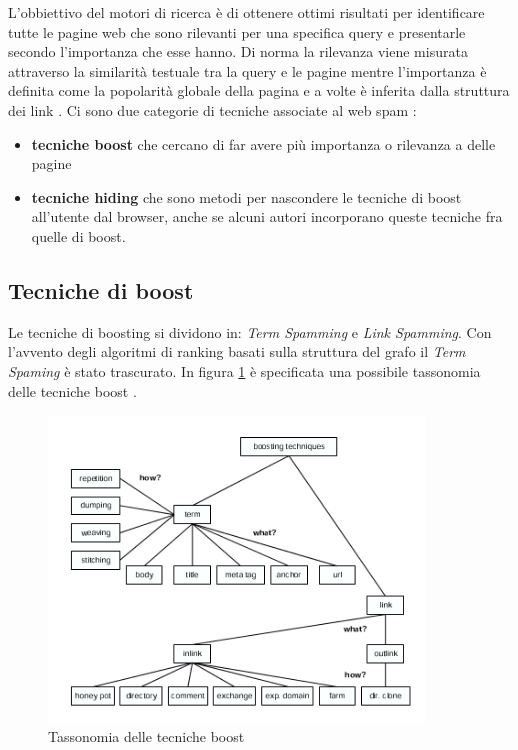 L'obbiettivo del motori di ricerca è di ottenere ottimi risultati per identificare tutte le pagine web che sono rilevanti per una specifica query e presentarle secondo l'importanza che esse hanno. Di norma la rilevanza viene misurata attraverso la similarità testuale tra la query e le pagine mentre l'importanza è definita come la popolarità globale della pagina e a volte è inferita dalla struttura dei link \cite{ilprints646}. Ci sono due categorie di tecniche associate al web spam \cite{ilprints646}:
\begin{itemize}
\item \textbf{tecniche boost} che cercano di far avere più importanza o rilevanza a delle pagine
\item \textbf{tecniche hiding} che sono metodi per nascondere le tecniche di boost all'utente dal browser, anche se alcuni autori incorporano queste tecniche fra quelle di boost.
\end{itemize}

\subsection{Tecniche di boost}
Le tecniche di boosting si dividono in: \textit{Term Spamming} e \textit{Link Spamming}. Con l'avvento degli algoritmi di ranking basati sulla struttura del grafo il \textit{Term Spaming} è stato trascurato. In figura \ref{fig:tassonomiaTecnicheBoost} è specificata una possibile tassonomia delle tecniche boost \cite{ilprints646}.
\begin{figure} 
 \centering
 \includegraphics[width=10cm]{immagini/tassonomiaTecnicheBoost}
 \caption{Tassonomia delle tecniche boost}
 \label{fig:tassonomiaTecnicheBoost}
\end{figure}

